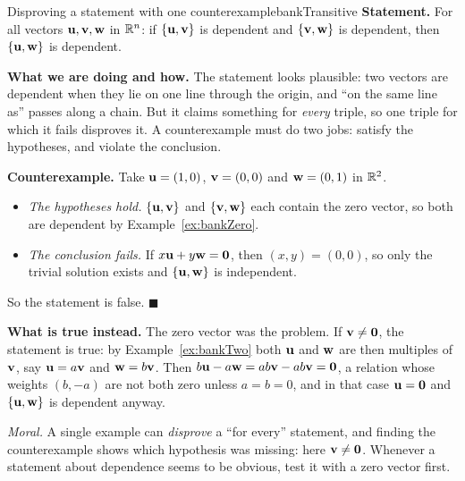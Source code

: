 \documentclass[11pt]{article}
\begin{document}
\begin{exmp}{Disproving a statement with one counterexample}{bankTransitive}
\textbf{Statement.} For all vectors $\mathbf{u},\mathbf{v},\mathbf{w}$ in $\mathbb{R}^n$: if $\{\mathbf{u},\mathbf{v}\}$ is dependent and $\{\mathbf{v},\mathbf{w}\}$ is dependent, then $\{\mathbf{u},\mathbf{w}\}$ is dependent.

\textbf{What we are doing and how.} The statement looks plausible: two vectors are dependent when they lie on one line through the origin, and ``on the same line as'' passes along a chain. But it claims something for \emph{every} triple, so one triple for which it fails disproves it. A counterexample must do two jobs: satisfy the hypotheses, and violate the conclusion.

\textbf{Counterexample.} Take $\mathbf{u}=(1,0)$, $\mathbf{v}=(0,0)$ and $\mathbf{w}=(0,1)$ in $\mathbb{R}^2$.
\begin{itemize}
  \item \emph{The hypotheses hold.} $\{\mathbf{u},\mathbf{v}\}$ and $\{\mathbf{v},\mathbf{w}\}$ each contain the zero vector, so both are dependent by Example~\ref{ex:bankZero}.
  \item \emph{The conclusion fails.} If $x\mathbf{u}+y\mathbf{w}=\mathbf{0}$, then $(x,y)=(0,0)$, so only the trivial solution exists and $\{\mathbf{u},\mathbf{w}\}$ is independent.
\end{itemize}
So the statement is false. \qquad$\blacksquare$

\textbf{What is true instead.} The zero vector was the problem. If $\mathbf{v}\neq\mathbf{0}$, the statement is true: by Example~\ref{ex:bankTwo} both $\mathbf{u}$ and $\mathbf{w}$ are then multiples of $\mathbf{v}$, say $\mathbf{u}=a\mathbf{v}$ and $\mathbf{w}=b\mathbf{v}$. Then $b\mathbf{u}-a\mathbf{w}=ab\mathbf{v}-ab\mathbf{v}=\mathbf{0}$, a relation whose weights $(b,-a)$ are not both zero unless $a=b=0$, and in that case $\mathbf{u}=\mathbf{0}$ and $\{\mathbf{u},\mathbf{w}\}$ is dependent anyway.

\emph{Moral.} A single example can \emph{disprove} a ``for every'' statement, and finding the counterexample shows which hypothesis was missing: here $\mathbf{v}\neq\mathbf{0}$. Whenever a statement about dependence seems to be obvious, test it with a zero vector first.
\end{exmp}
\end{document}
